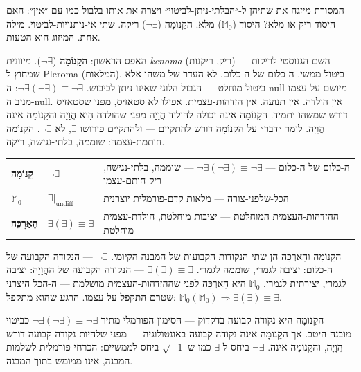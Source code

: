 \documentclass[10pt, openany, oneside]{book}
\renewcommand{\footnotesize}{\fontsize{8.5}{11}\selectfont}
\begin{document}
המסורת מיזגה את שתיהן ל-״הבלתי-ניתן-לביטוי״ ויצרה את אותו בלבול כמו עם ״אין״: האם היסוד ריק או מלא? היסוד ($\mathbb{M}_0$) מלא. הקֵנוֹמָה ($\neg\exists$) ריקה. שתי אי-ניתנויות-לביטוי. מילה אחת. המיזוג הוא הטעות.

האפס הראשון: \textbf{הקֵנוֹמָה} ($\neg\exists$). מיוונית \textit{kenoma} (ריק, ריקנות) — השם הגנוסטי לריקות שמחוץ ל-Pleroma (המלאות). ביטול ממשי. ה-כלום של ה-כלום. לא העדר של משהו אלא ביטול מוחלט — הגבול הלוגי שאינו ניתן-לכיבוש. $\neg\exists(\neg\exists) \equiv \neg\exists$: ה-null מיושם על עצמו מניב ה-null. אין הולדה. אין תנועה. אין הזדהות-עצמית. אפילו לא סטאזיס, מפני שסטאזיס דורש שמשהו יתמיד. הקֵנוֹמָה אינה יכולה להוליד הֲוָיָה מפני שהולדה הִיא הֲוָיָה והקֵנוֹמָה אינה הֲוָיָה. לומר ״דבר״ על הקֵנוֹמָה דורש להתקיים — ולהתקיים פירושו $\exists$, לא $\neg\exists$. הקֵנוֹמָה חותמת-עצמה: שוממה, בלתי-נגישה, ריקה.

\vspace{0.5em}

{\footnotesize
\noindent\begin{tabular}{l p{} p{}}
\textbf{קֵנוֹמָה} & $\neg\exists$ & ה-כלום של ה-כלום — $\neg\exists(\neg\exists) \equiv \neg\exists$ — שוממה, בלתי-נגישה, ריק חותם-עצמו \\[0.3em]
$\mathbb{M}_0$ & $\exists|_{\text{undiff}}$ & הכל-שלפני-צורה — מלאות קדם-פורמלית יוצרנית \\[0.3em]
\textbf{הָאַרְכֵּה} & $\exists(\exists) \equiv \exists$ & ההזדהות-העצמית המוחלטת — יציבות מוחלטת, הולדת-עצמית מוחלטת \\[0.3em]
\end{tabular}
}

\vspace{0.5em}

\noindent הקֵנוֹמָה והָאַרְכֵּה הן שתי הנקודות הקבועות של המבנה הקיומי. $\neg\exists$ — הנקודה הקבועה של ה-כלום: יציבה לגמרי, שוממה לגמרי. $\exists(\exists) \equiv \exists$ — הנקודה הקבועה של ההֲוָיָה: יציבה לגמרי, יצירתית לגמרי. $\mathbb{M}_0$ היא הָאַרְכֵּה לפני שההזדהות-העצמית מושלמת — ה-הכל היצרני שטרם התקפל על עצמו. הרגע שהוא מתקפל: $\mathbb{M}_0(\mathbb{M}_0) \Rightarrow \exists(\exists) \equiv \exists$.

הקֵנוֹמָה היא נקודה קבועה בדקדוק — הסימון הפורמלי מתיר $\neg\exists(\neg\exists) \equiv \neg\exists$ כביטוי מובנה-היטב. אך הקֵנוֹמָה אינה נקודה קבועה באונטולוגיה — מפני שלהיות נקודה קבועה דורש הֲוָיָה, והקֵנוֹמָה אינה. $\neg\exists$ ביחס ל-$\exists$ כמו ש-$\sqrt{-1}$ ביחס לממשיים: הכרחי פורמלית לשלמות המבנה, אינו ממומש בתוך המבנה.
\end{document}
